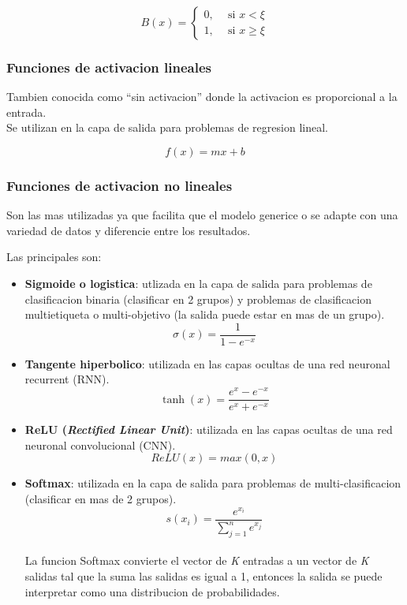 \documentclass[runningheads]{llncs} %
\begin{document}
\[
    B(x) =
    \left \{
        \begin{aligned}
        0, \ \ & \text{si } x < \xi  \\
        1, \ \ & \text{si } x \geq \xi
        \end{aligned}
    \right .
\]



\subsubsection{Funciones de activacion lineales}
Tambien conocida como \textquotedblleft{}sin activacion\textquotedblright{} 
donde la activacion es proporcional a la entrada. \cite{fun-activacion2} \\
Se utilizan en la capa de salida para problemas de regresion lineal. \cite{fun-activacion}

\[ f(x)=mx+b \]

\subsubsection{Funciones de activacion no lineales}
Son las mas utilizadas ya que facilita que el modelo generice o se adapte con una 
variedad de datos y diferencie entre los resultados. \cite{fun-activacion2}

Las principales son: 
\begin{itemize}
    \item{\textbf{Sigmoide o logistica}: utlizada en la capa de salida
    para problemas de clasificacion binaria (clasificar en 2 grupos) y problemas
    de clasificacion multietiqueta o multi-objetivo (la salida puede estar 
    en mas de un grupo). \cite{fun-activacion}
    \[\sigma(x) = \frac{1}{1-e^{-x}}\] } 
    \item{\textbf{Tangente hiperbolico}: utilizada en las capas ocultas 
    de una red neuronal recurrent (RNN). \cite{fun-activacion}
    \[\tanh(x) = \frac{e^{x}-e^{-x}}{e^{x}+e^{-x}}\]}
    \item{\textbf{ReLU (\textit{Rectified Linear Unit})}: utilizada en las capas
    ocultas de una red neuronal convolucional (CNN). \cite{fun-activacion}
    \[ReLU(x) = max(0,x)\]} 
    \item{\textbf{Softmax}: utilizada en la capa de salida para problemas
    de multi-clasificacion (clasificar en mas de 2 grupos). \cite{fun-activacion}
    \[ s(x_{i}) = \frac{e^{x_{i}}}{\sum_{j=1}^{n}{e^{x_{j}}}} \]}\\
    La funcion Softmax convierte el vector de \textit{K} entradas a un vector 
    de \textit{K} salidas tal que la suma las salidas es igual a 1,
    entonces la salida se puede interpretar como una distribucion de probabilidades.
    \cite{fun-softmax}
\end{itemize}
\end{document}

